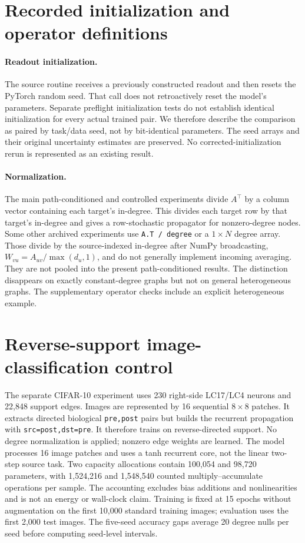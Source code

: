 \documentclass[10pt,letterpaper]{article}
\begin{document}


\section{Recorded initialization and operator definitions}

\paragraph{Readout initialization.}
The source routine receives a previously constructed readout and then
resets the PyTorch random seed. That call does not retroactively
reset the model's parameters. Separate preflight initialization tests do
not establish identical initialization for every actual trained pair.
We therefore describe the comparison as paired by task/data seed, not by
bit-identical parameters. The seed arrays and their original uncertainty
estimates are preserved. No corrected-initialization rerun is represented
as an existing result.

\paragraph{Normalization.}
The main path-conditioned and controlled experiments divide $A^\top$
by a column vector containing each target's in-degree.
This divides each target row by that target's in-degree and gives a
row-stochastic propagator for nonzero-degree nodes. Some other archived
experiments use \texttt{A.T / degree} or a $1\times N$ degree array.
Those divide by the source-indexed in-degree after NumPy broadcasting,
$W_{vu}=A_{uv}/\max(d_u,1)$, and do not generally implement incoming
averaging. They are not pooled into the present path-conditioned results.
The distinction disappears on exactly constant-degree graphs but not
on general heterogeneous graphs. The supplementary operator checks
include an explicit heterogeneous example.

\section{Reverse-support image-classification control}
\label{sec:supp-images}
The separate CIFAR-10 experiment uses 230 right-side LC17/LC4 neurons
and 22,848 support edges. Images are represented by 16 sequential
$8\!\times\!8$ patches. It extracts directed biological
\texttt{pre,post} pairs but builds the recurrent propagation with
\texttt{src=post,dst=pre}. It therefore trains on reverse-directed
support. No degree normalization is applied; nonzero edge weights are
learned. The model processes 16 image patches and uses a tanh recurrent
core, not the linear two-step source task. Two capacity allocations
contain 100,054 and 98,720 parameters, with 1,524,216 and 1,548,540
counted multiply--accumulate operations per sample. The accounting
excludes bias additions and nonlinearities and is not an energy or
wall-clock claim. Training is fixed at 15 epochs without augmentation
on the first 10,000 standard training images; evaluation uses the first
2,000 test images. The five-seed accuracy gaps average 20 degree nulls
per seed before computing seed-level intervals.
\end{document}
